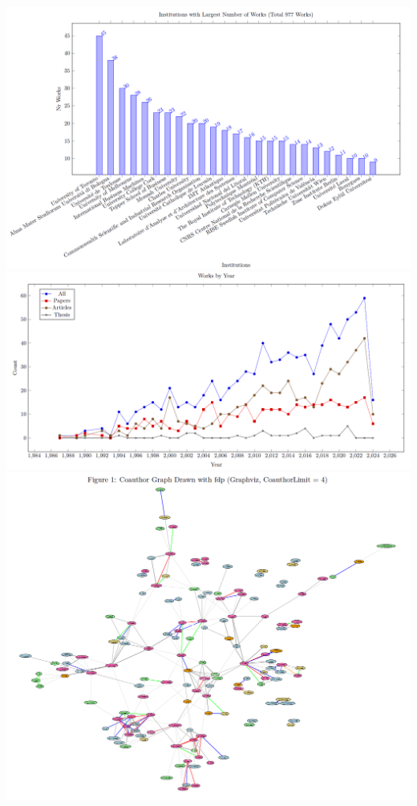 \documentclass[final,hyperref={pdfpagelabels=false}]{beamer}
\begin{document}
\begin{frame}{}
\begin{multicols}{2}
\includegraphics[width=35cm]{images/byinstitution}
\includegraphics[width=35cm]{images/byyear}
\includegraphics[width=35cm]{images/coauthorgraph}

\end{multicols}
\end{frame}
\end{document}
